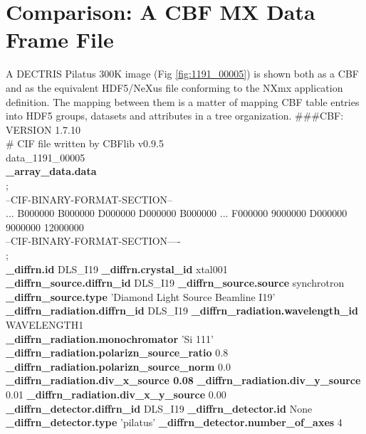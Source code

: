 \documentclass[11pt]{a0poster}
\begin{document}
\hspace{10mm}\hfill\begin{minipage}[]{0.29\linewidth}
\section*{Comparison:  A CBF MX Data Frame File}
\fontsize{18}{22}\selectfont 

A DECTRIS Pilatus 300K image (Fig \ref{fig:1191_00005}) is shown both as a CBF and as the equivalent HDF5/NeXus
file conforming to the NXmx application definition.  The mapping between them is a matter
of mapping CBF table entries into HDF5 groups, datasets and attributes in a tree organization.
\#\#\#CBF: VERSION 1.7.10\\
\# CIF file written by CBFlib v0.9.5\\
data\_1191\_00005\\
{\bf \_array\_data.data\\}
;\\
--CIF-BINARY-FORMAT-SECTION--\\
... B000000 B000000 D000000 D000000 B000000 ... F000000 9000000 D000000 9000000 12000000\\
--CIF-BINARY-FORMAT-SECTION----\\
;\\
{\bf \_diffrn.id} DLS\_I19  {\bf \_diffrn.crystal\_id} xtal001\\
{\bf \_diffrn\_source.diffrn\_id} DLS\_I19  {\bf \_diffrn\_source.source} synchrotron\\
{\bf \_diffrn\_source.type} 'Diamond Light Source Beamline I19'\\
{\bf \_diffrn\_radiation.diffrn\_id} DLS\_I19  {\bf \_diffrn\_radiation.wavelength\_id} WAVELENGTH1\\
{\bf \_diffrn\_radiation.monochromator} 'Si 111'\\
{\bf \_diffrn\_radiation.polarizn\_source\_ratio} 0.8  {\bf \_diffrn\_radiation.polarizn\_source\_norm} 0.0\\
{\bf \_diffrn\_radiation.div\_x\_source 0.08}  {\bf \_diffrn\_radiation.div\_y\_source} 0.01  {\bf \_diffrn\_radiation.div\_x\_y\_source} 0.00\\
{\bf \_diffrn\_detector.diffrn\_id} DLS\_I19  {\bf \_diffrn\_detector.id} None\\
{\bf \_diffrn\_detector.type} 'pilatus'  {\bf \_diffrn\_detector.number\_of\_axes} 4\\
\begin{figure}
\begin{center}

\end{center}
\end{figure}
\end{minipage}
\end{document}

